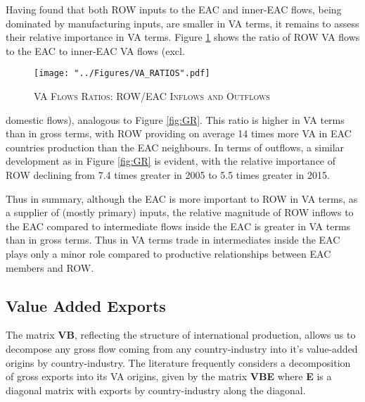 \documentclass[a4paper]{article}
\begin{document}
Having found that both ROW inputs to the EAC and inner-EAC flows, being dominated by manufacturing inputs, are smaller in VA terms, it remains to assess their relative importance in VA terms.  Figure \ref{fig:VAR} shows the ratio of ROW VA flows to the EAC to inner-EAC VA flows (excl.

\begin{figure}[h!] \vspace{-2mm}
\centering
\caption{\label{fig:VAR}\textsc{VA Flows Ratios: ROW/EAC Inflows and Outflows}}
\texttt{[image: "../Figures/VA\_RATIOS".pdf]} %
\vspace{-15mm}
\end{figure}
\FloatBarrier

\noindent domestic flows), analogous to Figure \ref{fig:GR}.  This ratio is higher in VA terms than in gross terms, with ROW providing on average 14 times more VA in EAC countries production than the EAC neighbours. In terms of outflows, a similar development as in Figure \ref{fig:GR} is evident, with the relative importance of ROW declining from 7.4 times greater in 2005 to 5.5 times greater in 2015.  \newline

Thus in summary, although the EAC is more important to ROW in VA terms, as a supplier of (mostly primary) inputs, the relative magnitude of ROW inflows to the EAC compared to intermediate flows inside the EAC is greater in VA terms than in gross terms. Thus in VA terms trade in intermediates inside the EAC plays only a minor role compared to productive relationships between EAC members and ROW. 



\subsection{Value Added Exports}

The matrix \textbf{VB}, reflecting the structure of international production, allows us to decompose any gross flow coming from any country-industry into it's value-added origins by country-industry. The literature frequently considers a decomposition of gross exports into its VA origins, given by the matrix \textbf{VBE} where \textbf{E} is a diagonal matrix with exports by country-industry along the diagonal.\newline  %
\end{document}
